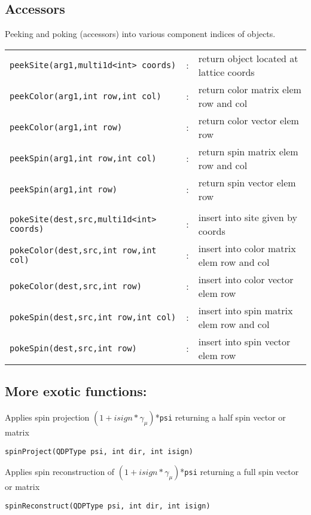 \documentclass[12pt,letterpaper]{article}
\begin{document}
\medskip

\subsection{Accessors}
\label{sec:peek}

Peeking and poking (accessors) into various component indices of objects.

\begin{flushleft}
\begin{tabular}{lcp{4.0in}}
\verb|peekSite(arg1,multi1d<int> coords)|&:& return object located at lattice coords\\
\verb|peekColor(arg1,int row,int col)|   &:& return color matrix elem row and col\\
\verb|peekColor(arg1,int row)|           &:& return color vector elem row\\
\verb|peekSpin(arg1,int row,int col)|   &:& return spin matrix elem row and col\\
\verb|peekSpin(arg1,int row)|            &:& return spin vector elem row\\
&&\\
\verb|pokeSite(dest,src,multi1d<int> coords)|&:& insert into site given by coords\\
\verb|pokeColor(dest,src,int row,int col)|   &:& insert into color matrix elem row and col\\
\verb|pokeColor(dest,src,int row)|           &:& insert into color vector elem row\\
\verb|pokeSpin(dest,src,int row,int col)|   &:& insert into spin matrix elem row and col\\
\verb|pokeSpin(dest,src,int row)|            &:& insert into spin vector elem row\\
\end{tabular}
\end{flushleft}


\medskip

\subsection{More exotic functions:}
\label{sec:otherfuncs}

\noindent
Applies spin projection  $(1 + isign*\gamma_\mu)$*\verb|psi|
returning a half spin vector or matrix
\begin{flushleft}
\verb|spinProject(QDPType psi, int dir, int isign)|
\end{flushleft}

\noindent
Applies spin reconstruction of $(1 + isign*\gamma_\mu)$*\verb|psi|
returning a full spin vector or matrix
\begin{flushleft}
\verb|spinReconstruct(QDPType psi, int dir, int isign)|
\end{flushleft}
\end{document}
